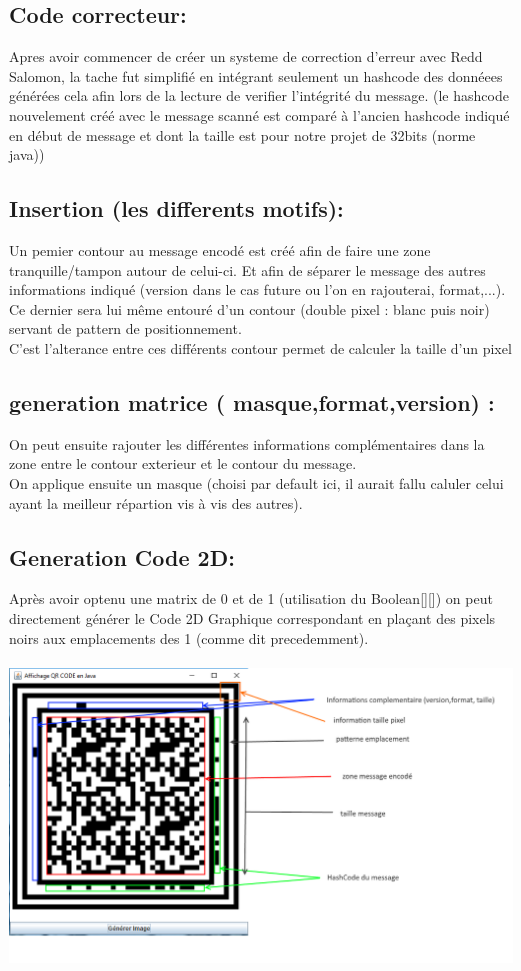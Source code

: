 \documentclass{article}
\begin{document}
\subsection{Code correcteur:}
Apres avoir commencer de créer un systeme de correction d'erreur avec Redd Salomon, la tache fut simplifié en intégrant seulement un hashcode des donnéees générées cela afin lors de la lecture de verifier l'intégrité du message. (le hashcode nouvelement créé avec le message scanné est comparé à l'ancien hashcode indiqué en début de message et dont la taille est pour notre projet de 32bits (norme java))
\\
\subsection{Insertion (les differents motifs):}
Un pemier contour au message encodé est créé afin de faire une zone tranquille/tampon autour de celui-ci. Et afin de séparer le message des autres informations indiqué (version dans le cas future ou l'on en rajouterai, format,...). Ce dernier sera lui même entouré d'un contour (double pixel : blanc puis noir) servant de pattern de positionnement.\\
C'est l'alterance entre ces différents contour permet de calculer la taille d'un pixel
\\
\subsection{ generation matrice ( masque,format,version) :}
On peut ensuite rajouter les différentes informations complémentaires dans la zone entre le contour exterieur et le contour du message.\\
On applique ensuite un masque (choisi par default ici, il aurait fallu caluler celui ayant la meilleur répartion vis à vis des autres).
\\
\subsection{Generation Code 2D:}
Après avoir optenu une matrix de 0 et de 1 (utilisation du Boolean[][]) on peut directement générer le Code 2D Graphique correspondant en plaçant des pixels noirs aux emplacements des 1 (comme dit precedemment).
\\\\
\includegraphics[scale=0.5]{schema.png} 
\\\\
\end{document}
